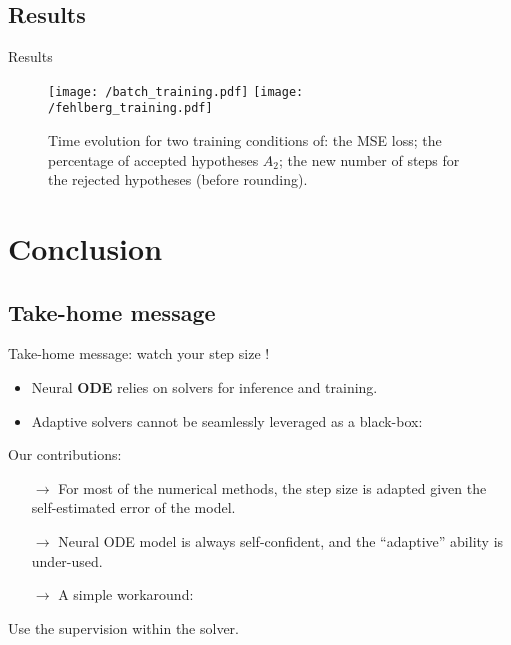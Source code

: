 \documentclass{EESD}
\begin{document}
\subsection{Results}
\begin{frame}{Results}
    \begin{figure}
        \centering
        \texttt{[image: /batch\_training.pdf]}
        \texttt{[image: /fehlberg\_training.pdf]}
        \caption{Time evolution for two training conditions of: the MSE loss; the percentage of accepted hypotheses $A_2$; the new number of steps for the rejected hypotheses (before rounding).}
        \label{fig:lorenz_error}
    \end{figure}                                                    
\end{frame}


\section{Conclusion}

\subsection{Take-home message}
\begin{frame}{Take-home message: watch your step size !}
  \begin{itemize}
  \item Neural \textbf{ODE} relies on
    solvers for inference and training. 
  \item  Adaptive solvers cannot be seamlessly
    leveraged as a black-box: %
  \end{itemize}
  \begin{alertblock}{Our contributions:}
    \begin{itemize}
    \item[$\rightarrow$] For most of the numerical methods, the step size is adapted given the self-estimated error of the model.
    \item[$\rightarrow$] Neural ODE model is always self-confident, and the ``adaptive'' ability is under-used. 
    \item[$\rightarrow$] A simple workaround:
    \end{itemize}
  \begin{center}
    Use the supervision within the solver.
  \end{center}
  \end{alertblock}
\end{frame}
\end{document}
